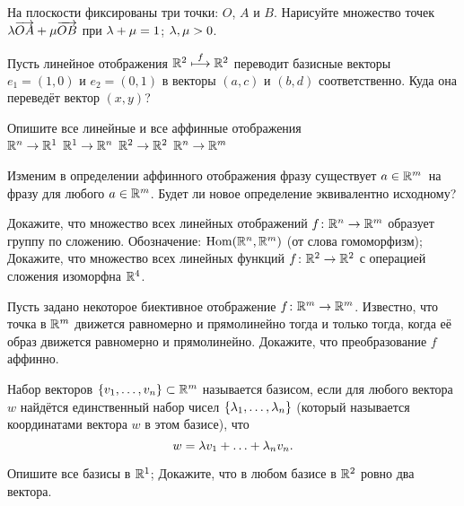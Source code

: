\documentclass[a4paper,12pt]{scrartcl}
\newcommand{\wa}{\overrightarrow}
\begin{document}
На плоскости фиксированы три точки: $O$, $A$ и $B$. Нарисуйте множество точек $\la \wa{OA}+\mu\wa{OB}$ при  $\lambda+\mu = 1$;  $\lambda,\mu>0$.


  Пусть линейное отображения $\mathbb{R}^2\stackrel{f}{\longmapsto}\mathbb{R}^2$ переводит базисные векторы
  $e_1=(1,0)$ и $e_2=(0,1)$ в векторы $(a,c)$ и $(b,d)$ соответственно.
  Куда она переведёт вектор $(x,y)$?

  Опишите все линейные и все аффинные отображения\\
   $\mathbb{R}^n\rightarrow\mathbb{R}^1$\hfill
   $\mathbb{R}^1\rightarrow\mathbb{R}^n$\hfill
   $\mathbb{R}^2\rightarrow\mathbb{R}^2$\hfill
   $\mathbb{R}^n\rightarrow\mathbb{R}^m$

  Изменим в определении аффинного отображения фразу  существует
  $a\in\mathbb{R}^m$\ на фразу  для любого $a\in\mathbb{R}^m$. Будет ли
  новое определение эквивалентно исходному?


Докажите, что множество всех линейных отображений $f\colon\mathbb{R}^n\rightarrow\mathbb{R}^m$ образует группу по сложению. Обозначение: $\operatorname{Hom}(\mathbb{R}^n,\mathbb{R}^m)$ (от слова  гомоморфизм);
Докажите, что множество всех линейных функций $f\colon\mathbb{R}^2\rightarrow\mathbb{R}^2$ с операцией сложения изоморфна $\mathbb{R}^4$.

Пусть задано некоторое биективное отображение $f\colon \mathbb{R}^m\rightarrow\mathbb{R}^m$. Известно, что точка в $\mathbb{R}^m$ движется равномерно и прямолинейно тогда и только тогда, когда её образ движется равномерно и прямолинейно. Докажите, что преобразование $f$ аффинно.

Набор векторов $\left\{v_1,\ldots, v_n\right\}\subset\mathbb{R}^m$ называется базисом, если для любого вектора $w$ найдётся единственный набор чисел $\left\{\lambda_1,\ldots,\lambda_n\right\}$ (который называется координатами вектора $w$ в этом базисе), что
$$w = \lambda v_1 + \ldots + \lambda_n v_n.$$

Опишите все базисы в $\mathbb{R}^1$;
Докажите, что в любом базисе в $\mathbb{R}^2$ ровно два вектора.





\end{document}
